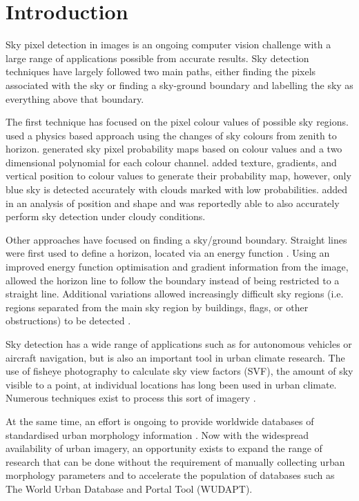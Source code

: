 \documentclass[final,3p,times,authoryear]{elsarticle}
\begin{document}
\section{Introduction}\label{sec:introduction}
Sky pixel detection in images is an ongoing computer vision challenge with a large range of applications possible from accurate results. Sky detection techniques have largely followed two main paths, either finding the pixels associated with the sky or finding a sky-ground boundary and labelling the sky as everything above that boundary. 

The first technique has focused on the pixel colour values of possible sky regions. \cite{Luo2002} used a physics based approach using the changes of sky colours from zenith to horizon. \cite{Gallagher2004} generated sky pixel probability maps based on colour values and a two dimensional polynomial for each colour channel. \cite{Zafarifar2007} added texture, gradients, and vertical position to colour values to generate their probability map, however, only blue sky is detected accurately with clouds marked with low probabilities. \cite{Schmitt2009} added in an analysis of position and shape and was reportedly able to also accurately perform sky detection under cloudy conditions. 

Other approaches have focused on finding a sky/ground boundary. Straight lines were first used to define a horizon, located via an energy function \citep{Ettinger2003}. Using an improved energy function optimisation and gradient information from the image, \cite{Shen2013} allowed the horizon line to follow the boundary instead of being restricted to a straight line. Additional variations allowed increasingly difficult sky regions (i.e. regions separated from the main sky region by buildings, flags, or other obstructions) to be detected \citep{Zhijie2014,Zhijie2015}.

Sky detection has a wide range of applications such as for autonomous vehicles or aircraft navigation, but is also an important tool in urban climate research. The use of fisheye photography to calculate sky view factors (SVF), the amount of sky visible to a point, at individual locations has long been used in urban climate. Numerous techniques exist to process this sort of imagery \citep{Grimmond2001,Chapman2004,Ali-Toudert2007}. 

At the same time, an effort is ongoing to provide worldwide databases of standardised urban morphology information \citep{Mills2015}. Now with the widespread availability of urban imagery, an opportunity exists to expand the range of research that can be done without the requirement of manually collecting urban morphology parameters and to accelerate the population of databases such as The World Urban Database and Portal Tool (WUDAPT).
\end{document}
